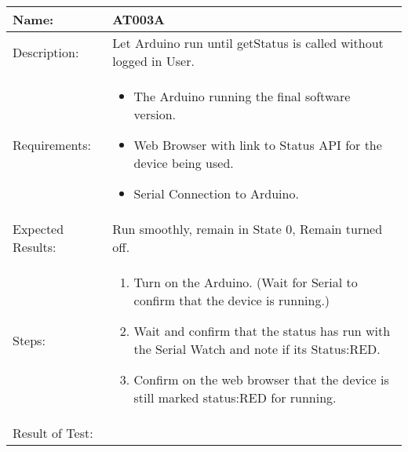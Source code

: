 \begin{table}[h]
	\centering
		\begin{tabular*}{\textwidth}{|l|l|}
		\hline
		\hline
		Name: & AT003A\\
		\hline
		Description: & Let Arduino run until getStatus is called without logged in User.\\
		\hline
		Requirements: & \parbox{0.85\textwidth}{
		\begin{itemize}
			\item The Arduino running the final software version.
			\item Web Browser with link to Status API for the device being used.
			\item Serial Connection to Arduino.
		\end{itemize}}
		\\
		\hline
		Expected Results: & \parbox{.85\textwidth}{Run smoothly, remain in State 0, Remain turned off.}\\
		\hline
		Steps: & \parbox{.85\textwidth}{
		\begin{enumerate}
			\item Turn on the Arduino. (Wait for Serial to confirm that the device is running.)
			\item Wait and confirm that the status has run with the Serial Watch and note if its Status:RED.
			\item Confirm on the web browser that the device is still marked status:RED for running.
		\end{enumerate}}
		\\
		\hline
		Result of Test: & \\
		\hline
		\end{tabular*}
\end{table}

